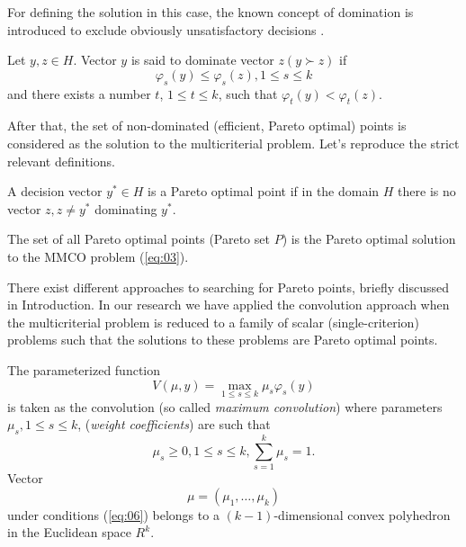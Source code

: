 \documentclass[runningheads]{llncs}
\begin{document}
For defining the solution in this case, the known concept of domination is introduced to exclude obviously unsatisfactory decisions \cite{Pardalos2017,Marler2009}.
\begin{definition}
Let $y, z \in H$. Vector $y$ is said to dominate vector $z (y \succ z)$ if  
\begin{equation}
    \label{eq:04}
    \varphi_s(y) \leq \varphi_s(z), 1 \leq s \leq k
\end{equation}
and there exists a number $t$, $1 \leq t \leq k$, such that $\varphi_t(y) < \varphi_t(z)$.
\end{definition}

After that, the set of non-dominated (efficient, Pareto optimal) points is considered as the solution to the multicriterial problem. Let's reproduce the strict relevant definitions.
\begin{definition}
A decision vector $y^* \in H$ is a Pareto optimal point if in the domain $H$ there is no vector $z, z\neq y^*$ dominating $y^*$.
\end{definition}
\begin{definition}
The set of all Pareto optimal points (Pareto set $P$) is the Pareto optimal solution to the MMCO problem (\ref{eq:03}).
\end{definition}


There exist different approaches to searching for Pareto points, briefly discussed in Introduction. In our research we have applied the convolution approach when the multicriterial problem is reduced to a family of scalar (single-criterion) problems such that the solutions to these problems are Pareto optimal points.

The parameterized function
\begin{equation}
    \label{eq:05}
    V(\mu, y) = \max_{1 \leq s \leq k} \mu_s \varphi_s(y)
\end{equation}
is taken as the convolution (so called \textit{maximum convolution}) where parameters $\mu_s, 1 \leq s \leq k$, (\textit{weight coefficients}) are such that 
\begin{equation}
    \label{eq:06}
    \mu_s \geq 0, 1 \leq s \leq k, \sum_{s=1}^k \mu_s=1.
\end{equation}
Vector
\begin{equation}
    \label{eq:06a}
    \mu = (\mu_1, \dots, \mu_k) 
\end{equation}
under conditions (\ref{eq:06}) belongs to a $(k-1)$-dimensional convex polyhedron in the Euclidean space  $R^k$.
\end{document}
